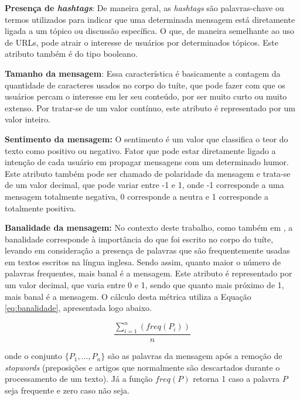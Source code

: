\documentclass[oneside,openright,12pt]{ufsm_2015} %
\begin{document}
    \par \textbf{Presença de \textit{hashtags}}: De maneira geral, as \textit{hashtags} são palavras-chave ou termos utilizados para indicar que uma determinada mensagem está diretamente ligada a um tópico ou discussão específica. O que, de maneira semelhante ao uso de URLs, pode atrair o interesse de usuários por determinados tópicos. Este atributo também é do tipo booleano.

    \par \textbf{Tamanho da mensagem}: Essa característica é basicamente a contagem da quantidade de caracteres usados no corpo do tuíte, que pode fazer com que os usuários percam o interesse em ler seu conteúdo, por ser muito curto ou muito extenso. Por tratar-se de um valor contínuo, este atributo é representado por um valor inteiro.

    \par \textbf{Sentimento da mensagem:} O sentimento é um valor que classifica o teor do texto como positivo ou negativo. Fator que pode estar diretamente ligado a intenção de cada usuário em propagar mensagens com um determinado humor. Este atributo também pode ser chamado de polaridade da mensagem e trata-se de um valor decimal, que pode variar entre -1 e 1, onde -1 corresponde a uma mensagem totalmente negativa, 0 corresponde a neutra e 1 corresponde a totalmente positiva.

    \par \textbf{Banalidade da mensagem:} No contexto deste trabalho, como também em \cite{artigo:oliveira:18}, a banalidade corresponde à importância do que foi escrito no corpo do tuíte, levando em consideração a presença de palavras que são frequentemente usadas em textos escritos na língua inglesa. Sendo assim, quanto maior o número de palavras frequentes, mais banal é a mensagem. Este atributo é representado por um valor decimal, que varia entre 0 e 1, sendo que quanto mais próximo de 1, mais banal é a mensagem. O cálculo desta métrica utiliza a Equação \ref{eq:banalidade}, apresentada logo abaixo.

    \begin{equation} \label{eq:banalidade}
    \frac{\sum_{i=1}^n (freq(P_i))}{n}
    \end{equation}
    
    \par onde o conjunto $\{P_1, ..., P_n\}$ são as palavras da mensagem após a remoção de \textit{stopwords} (preposições e artigos que normalmente são descartados durante o processamento de um texto). Já a função $freq(P)$ retorna 1 caso a palavra $P$ seja frequente e zero caso não seja.
\end{document}
